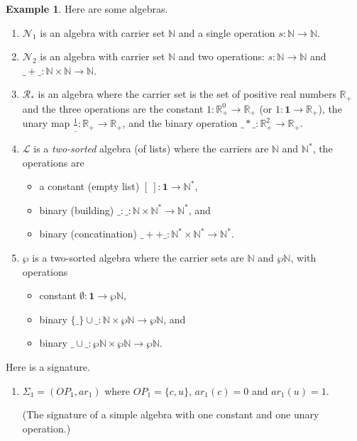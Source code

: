 \documentclass{amsart}
\theoremstyle{definition}
\newtheorem{example}[thm]{Example}
\newcommand{\nn}{\mathbb N} %
\newcommand{\rr}{\mathbb R} %
\begin{document}
\begin{example} Here are some algebras.
  \begin{enumerate}
  \item $\mathcal N_1$ is an algebra with carrier set $\mathbb N$ and a single operation $s : \nn \to \nn$.
  \item $\mathcal N_2$ is an algebra with carrier set $\nn$ and two operations: $s : \nn \to \nn$ and $\_+\_ : \nn \times \nn \to \nn$.
  \item $\mathcal R_\ast$ is an algebra where the carrier set is the set of positive real numbers $\mathbb R_+$ and the three operations are the constant $1 : \rr_+^0 \to \rr_+$ (or $1 : \mathbf 1 \to \rr_+$), the unary map $\frac 1 \_ : \rr_+ \to \rr_+$, and the binary operation $\_*\_ : \rr_+^2 \to \rr_+$.
  \item $\mathcal L$ is a \textit{two-sorted} algebra (of lists) where the carriers are $\nn$ and $\nn^\ast$, the operations are
    \begin{itemize}
    \item a constant (empty list) $[\ ] : \mathbf 1 \to \nn^\ast$,
    \item binary (building) $\_ :\_ : \nn \times \nn^\ast \to \nn^\ast$, and
    \item binary (concatination) $\_ ++ \_ : \nn^\ast \times \nn^\ast \to \nn^\ast$.
    \end{itemize}
  \item $\wp$ is a two-sorted algebra where the carrier sets are $\nn$ and $\wp \nn$, with operations
    \begin{itemize}
    \item constant $\emptyset : \mathbf 1 \to \wp \nn$,
    \item binary $\{\_\}\cup\_ : \nn \times \wp \nn \to \wp \nn$, and
    \item binary $\_ \cup \_ : \wp\nn \times \wp \nn \to \wp \nn$.
    \end{itemize}
  \end{enumerate}

  Here is a signature.
  \begin{enumerate}
    \item $\Sigma_1 = (OP_1, ar_1)$ where $OP_1 = \{c, u\}$, $ar_1(c) = 0$ and $ar_1(u) = 1$. 

      (The signature of a simple algebra with one constant and one unary operation.)
  \end{enumerate}
\end{example}
\end{document}
